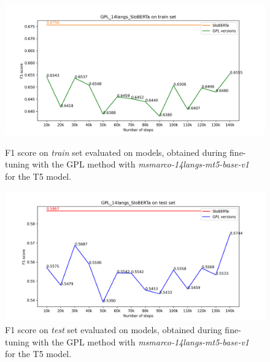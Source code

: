 \documentclass[fleqn,moreauthors,10pt]{ds_report}
\begin{document}
\begin{figure}
    \centering
    \begin{minipage}{0.5\textwidth}
        \centering
        \includegraphics[width=\linewidth]{graphs/GPL_14langs_SloBERTa_train.png}
        \caption{F1 score on \textit{train} set evaluated on models, obtained during fine-tuning with the GPL method with {\it msmarco-14langs-mt5-base-v1}~\cite{msmarco14langs} for the T5 model.}
		\label{fig:gpl-sloberta-versions-train}
    \end{minipage}\hfill
    \begin{minipage}{0.5\textwidth}
        \centering
        \includegraphics[width=\linewidth]{graphs/GPL_14langs_SloBERTa_test.png}
        \caption{F1 score on \textit{test} set evaluated on models, obtained during fine-tuning with the GPL method with {\it msmarco-14langs-mt5-base-v1}~\cite{msmarco14langs} for the T5 model.}
		\label{fig:gpl-sloberta-versions}
    \end{minipage}
\end{figure}
\end{document}
